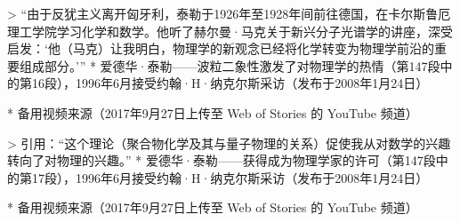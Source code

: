 \begin{enumerate}
  > “由于反犹主义离开匈牙利，泰勒于1926年至1928年间前往德国，在卡尔斯鲁厄理工学院学习化学和数学。他听了赫尔曼·马克关于新兴分子光谱学的讲座，深受启发：‘他（马克）让我明白，物理学的新观念已经将化学转变为物理学前沿的重要组成部分。’”
* 爱德华·泰勒——波粒二象性激发了对物理学的热情（第147段中的第16段），1996年6月接受约翰·H·纳克尔斯采访（发布于2008年1月24日）

  * 备用视频来源（2017年9月27日上传至 Web of Stories 的 YouTube 频道）

  > 引用：“这个理论（聚合物化学及其与量子物理的关系）促使我从对数学的兴趣转向了对物理的兴趣。”
* 爱德华·泰勒——获得成为物理学家的许可（第147段中的第17段），1996年6月接受约翰·H·纳克尔斯采访（发布于2008年1月24日）

  * 备用视频来源（2017年9月27日上传至 Web of Stories 的 YouTube 频道）

\end{enumerate}